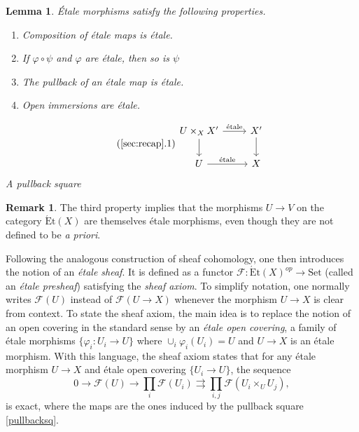 \documentclass{article}
\newcommand{\Set}{\mathrm{Set}}
\newcommand{\Et}{\acute{\mathrm{E}}\mathrm{t}}
\theoremstyle{plain}
\newtheorem{lemma}[theorem]{Lemma}
\theoremstyle{definition}
\newtheorem{remark}[theorem]{Remark}
\begin{document}
    \begin{lemma}\label{lem:etaleproperties}
        \'{E}tale morphisms satisfy the following properties.
        \vspace{0.4cm}

        \begin{minipage}{0.45\textwidth}
            \begin{enumerate}[(1)]
                \item Composition of \'{e}tale maps is \'{e}tale.
                \item If $\varphi\circ\psi$ and $\varphi$ are \'{e}tale, then so is $\psi$
                \item The pullback of an \'{e}tale map is \'{e}tale.
                \item Open immersions are \'{e}tale.
            \end{enumerate}       
        \end{minipage}
        \begin{minipage}{0.45\textwidth}
            \centering
            \begin{equation}\tag{\ref{sec:recap}.1}\label{pullbacksq}
                \begin{tikzcd}
                    U\times_X X' \arrow[r,"\text{\'{e}tale}"] \arrow[d,""] & X' \arrow[d,""] \\
                    U \arrow[r,"\text{\'{e}tale}"] & X
                \end{tikzcd}
            \end{equation}
            A pullback square
        \end{minipage}        
    \end{lemma}

    \begin{remark}
        The third property implies that the morphisms $U\to V$ on the category $\Et(X)$ are themselves \'{e}tale morphisms, even though they are not defined to be \textit{a priori}.
    \end{remark}



    Following the analogous construction of sheaf cohomology, one then introduces the notion of an \textit{\'{e}tale sheaf}. It is defined as a functor $\mathcal{F} :\Et(X)^{op}\to\Set$ (called an \textit{\'{e}tale presheaf}) satisfying the \textit{sheaf axiom}. To simplify notation, one normally writes $\mathcal{F} (U)$ instead of $\mathcal{F} (U\to X)$ whenever the morphism $U\to X$ is clear from context. To state the sheaf axiom, the main idea is to replace the notion of an open covering in the standard sense by an \textit{\'{e}tale open covering}, a family of \'{e}tale morphisms $\{\varphi_i:U_i\to U\}$ where $\cup_i\varphi_i(U_i)=U$ and $U\to X$ is an \'{e}tale morphism. With this language, the sheaf axiom states that for any \'{e}tale morphism $U\to X$ and \'{e}tale open covering $\{U_i\to U\}$, the sequence
    $$0\longrightarrow \mathcal{F} (U)\longrightarrow\prod_i\mathcal{F} (U_i)\rightrightarrows\prod_{i,j}\mathcal{F} (U_i\times_U U_j),$$
    is exact, where the maps are the ones induced by the pullback square \eqref{pullbacksq}.
\end{document}
